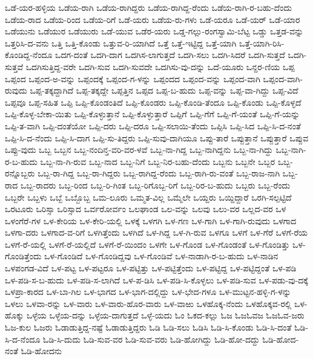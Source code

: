 ಒಡೆ-ಯರ-ಹಳ್ಳಿಯ
ಒಡೆಯ-ರಾಗಿ
ಒಡೆಯ-ರಾಗಿದ್ದರು
ಒಡೆಯ-ರಾಗಿದ್ದ-ರೆಂದು
ಒಡೆಯ-ರಾಗಿ-ರ-ಬಹು-ದೆಂದು
ಒಡೆಯ-ರಾದ
ಒಡೆಯ-ರಿಂದ
ಒಡೆಯ-ರಿಗೆ
ಒಡೆ-ಯರು
ಒಡೆಯ-ರು-ಗಳು
ಒಡೆ-ಯರೂ
ಒಡೆ-ಯರ್
ಒಡೆ-ಯಾರ
ಒಡೆಯುನು
ಒಡೆಯುರ
ಒಡೆಯುರು
ಒಡೆ-ಯುವ
ಒಡೆರ-ಯರು
ಒಡ್ಡ-ಗಲ್ಲು-ರಂಗಸ್ವಾಮಿ-ಬೆಟ್ಟ
ಒಡ್ಡು
ಒತ್ತಡ-ವನ್ನು
ಒತ್ತರಿಸಿ-ದ-ವನು
ಒತ್ತಿ
ಒತ್ತಿ-ಕೊಂಡು
ಒತ್ತುವ-ರಿ-ಯಾಗಿದೆ
ಒತ್ತೆ
ಒತ್ತೆ-ಇಟ್ಟಿದ್ದ
ಒತ್ತೆ-ಯಾಗಿ
ಒತ್ತೆ-ಯಾಗಿ-ರಿಸಿ-ಕೊಂಡಿದ್ದ-ನೆಂದೂ
ಒದಗ-ದಂತೆ
ಒದಗಿ-ದಾಗ
ಒದಗಿಸ-ಲಾಗುತ್ತದೆ
ಒದಗಿ-ಸಲು
ಒದಗಿ-ಸಿದರೆ
ಒದಗಿ-ಸುತ್ತದೆ
ಒದಗಿ-ಸುತ್ತವೆ
ಒದಗಿಸುತ್ತಿದ್ದ-ವರೇ
ಒದಗಿ-ಸುವ
ಒದಗಿ-ಸುವದೇ
ಒದಗಿಸು-ವು-ದನ್ನು
ಒದೆ-ಯೂರು
ಒನ್ದರ-ಣಿಯ
ಒಪ್ಪ
ಒಪ್ಪಂದ
ಒಪ್ಪಂದ-ಅ-ವನ್ನು
ಒಪ್ಪಂದಕ್ಕೆ
ಒಪ್ಪಂದ-ಗ-ಳನ್ನು
ಒಪ್ಪಂದದ
ಒಪ್ಪಂದ-ವನ್ನು
ಒಪ್ಪಂದ-ವಾಗಿ
ಒಪ್ಪಂದ-ವಾಗಿ-ರುವುದು
ಒಪ್ಪ-ತಕ್ಕದ್ದಾಗಿದೆ
ಒಪ್ಪ-ತಕ್ಕದ್ದೇ
ಒಪ್ಪತ್ತಿನ
ಒಪ್ಪದ
ಒಪ್ಪ-ಬ-ಹುದು
ಒಪ್ಪ-ವನ್ನು
ಒಪ್ಪ-ವಾ-ಗಿದ್ದು
ಒಪ್ಪ-ವಿದೆ
ಒಪ್ಪವೂ
ಒಪ್ಪ-ಸಹಿತ
ಒಪ್ಪಿ
ಒಪ್ಪಿ-ಕೊಂಡಂತಿದೆ
ಒಪ್ಪಿ-ಕೊಂಡರು
ಒಪ್ಪಿ-ಕೊಂಡಿ-ತೆಂದೂ
ಒಪ್ಪಿ-ಕೊಂಡು
ಒಪ್ಪಿ-ಕೊಳ್ಳದೆ
ಒಪ್ಪಿ-ಕೊಳ್ಳ-ಬೇಕಾ-ಯಿತು
ಒಪ್ಪಿ-ಕೊಳ್ಳುತ್ತಾನೆ
ಒಪ್ಪಿ-ಕೊಳ್ಳುತ್ತಾರೆ
ಒಪ್ಪಿಗೆ
ಒಪ್ಪಿ-ಗೆಗೆ
ಒಪ್ಪಿ-ಗೆ-ಯಂತೆ
ಒಪ್ಪಿ-ಗೆ-ಯನ್ನು
ಒಪ್ಪಿ-ತ-ವಾಗಿ
ಒಪ್ಪಿ-ದಂತೆಯೋ
ಒಪ್ಪಿ-ದರು
ಒಪ್ಪಿ-ದರೂ
ಒಪ್ಪಿ-ಸಲಾಯಿ-ತೆಂದು
ಒಪ್ಪಿಸಿ
ಒಪ್ಪಿ-ಸಿದ
ಒಪ್ಪಿ-ಸಿ-ದ-ನಂತೆ
ಒಪ್ಪಿ-ಸಿ-ದ-ನೆಂದು
ಒಪ್ಪಿ-ಸಿ-ದಾಗ
ಒಪ್ಪಿ-ಸು-ತಿದ್ದರು
ಒಪ್ಪಿ-ಸುವು-ದಾಗಿಯೂ
ಒಪ್ಪು-ತಾರೆ
ಒಪ್ಪುತ್ತಾನೆ
ಒಪ್ಪುತ್ತಾರೆ
ಒಪ್ಪುವ
ಒಪ್ಪು-ವುದು
ಒಬ್ಬ
ಒಬ್ಬನ
ಒಬ್ಬ-ನಂದಿನ್ತ-ವರಿ-ವರ-ಳವೆ
ಒಬ್ಬ-ನಾ-ಗಿದ್ದ
ಒಬ್ಬ-ನಾಗಿದ್ದನು
ಒಬ್ಬ-ನಾ-ಗಿದ್ದು
ಒಬ್ಬ-ನಾಗಿ-ರ-ಬ-ಹುದು
ಒಬ್ಬ-ನಾ-ಗಿ-ರುವ
ಒಬ್ಬ-ನಾದ
ಒಬ್ಬ-ನಿಗೆ
ಒಬ್ಬ-ನಿರ-ಬಹು-ದೆಂದು
ಒಬ್ಬನು
ಒಬ್ಬನೇ
ಒಬ್ಬರ
ಒಬ್ಬ-ರನ್ನೊಬ್ಬರು
ಒಬ್ಬ-ರಾ-ಗಿದ್ದ
ಒಬ್ಬ-ರಾ-ಗಿದ್ದರು
ಒಬ್ಬ-ರಾಗಿದ್ದ-ರೆಂದು
ಒಬ್ಬ-ರಾಗಿ-ರು-ವಂತೆ
ಒಬ್ಬ-ರಾಜ-ನಾಗಿ
ಒಬ್ಬ-ರಾದ
ಒಬ್ಬ-ರಾದರು
ಒಬ್ಬ-ರಿಂದ
ಒಬ್ಬ-ರಿ-ಗಿಂತ
ಒಬ್ಬ-ರಿಗೊಬ್ಬ-ರಿಗೆ
ಒಬ್ಬ-ರಿರ-ಬ-ಹುದು
ಒಬ್ಬರು
ಒಬ್ಬ-ರೆಂದು
ಒಬ್ಬರೇ
ಒಬ್ಬಳು
ಒಬ್ಬೆ
ಒಬ್ಬೊಬ್ಬ
ಒಮ-ಲೂರು
ಒಮ್ಮತ-ವಿಲ್ಲ
ಒಮ್ಮೆಲೇ
ಒಯ್ದರು
ಒಯ್ದಿದ್ದಾರೆ
ಒರಗಿ-ಸಲ್ಪಟ್ಟಿದೆ
ಒರಟೂರು
ಒರಿಸ್ಸಾ
ಒರಿಸ್ಸಾದ
ಒರ್ವರೋರ್ವಂ
ಒಲಘಾಂಡ
ಒಲ-ವನ್ನು
ಒಲವು
ಒಲು-ವರ
ಒಲ್ಲದ-ವರ
ಒಳ
ಒಳಂಗೆರೆ-ಗಳ
ಒಳ-ಕೇರಿಯ
ಒಳ-ಕೇರಿ-ಯಲ್ಲಿ
ಒಳಕ್ಕೆ
ಒಳಗಗಿ
ಒಳ-ಗಣ
ಒಳ-ಗಾಗಿ
ಒಳ-ಗಾಗಿ-ರುವುದು
ಒಳಗಾದ
ಒಳಗಾ-ದರು
ಒಳಗಾದ-ವ-ರಿಗೆ
ಒಳಗಿತ್ತೆಂದು
ಒಳಗಿದೆ
ಒಳ-ಗಿದ್ದ
ಒಳ-ಗಿ-ರುವ
ಒಳಗೂ
ಒಳಗೆ
ಒಳ-ಗೆರೆ
ಒಳಗೆ-ರೆಯ
ಒಳಗೆ-ರೆ-ಯಲ್ಲಿ
ಒಳಗೆ-ರೆ-ಯಲ್ಲಿದೆ
ಒಳಗೆ-ರೆ-ಯಿಂದಂ
ಒಳಗೇ
ಒಳ-ಗೊಂಡ
ಒಳ-ಗೊಂಡಂತೆ
ಒಳ-ಗೊಂಡಿತ್ತು
ಒಳ-ಗೊಂಡಿತ್ತೆಂದು
ಒಳ-ಗೊಂಡಿದೆ
ಒಳ-ಗೊಂಡಿದ್ದವು
ಒಳ-ಗೊಂಡಿವೆ
ಒಳ-ನಾಡಾಗಿ-ರ-ಬ-ಹುದು
ಒಳ-ನಾಡಿನ
ಒಳಪಂಗಡ-ವಿದೆ
ಒಳ-ಪಟ್ಟ
ಒಳ-ಪಟ್ಟರೂ
ಒಳ-ಪಟ್ಟಿತ್ತು
ಒಳ-ಪಟ್ಟಿತ್ತೆಂದು
ಒಳ-ಪಟ್ಟಿದ್ದ
ಒಳ-ಪಟ್ಟಿದ್ದಂತೆ
ಒಳ-ಪಡಿ
ಒಳ-ಪಡಿ-ಸ-ಬ-ಹುದು
ಒಳ-ಪಡಿ-ಸ-ಲಾಗಿದೆ
ಒಳ-ಪ-ಡಿಸಿ
ಒಳ-ಪಡಿ-ಸಿ-ಕೊಳ್ಳಲು
ಒಳ-ಪಡಿ-ಸುವ
ಒಳ-ಪಡು-ವು-ದಕ್ಕೆ
ಒಳಪ್ರಾ-ಕಾರದ
ಒಳ-ಬಾ-ಗಿಲ
ಒಳ-ಭಾಗದ
ಒಳ-ಭಾಗ-ದಲ್ಲಿದ್ದು
ಒಳ-ಭೇದ-ಗಳೂ
ಒಳ-ಮುಟ್ಟನ-ಹಳ್ಳಿ-ಗ-ಳನ್ನು
ಒಳಲು
ಒಳವಾ-ರನ್ನು
ಒಳ-ವಾರು
ಒಳ-ವಾರು-ಹೊರ-ವಾರು
ಒಳ-ವಾಱು
ಒಳಹೊಕ್ಕ-ನೆಂದು
ಒಳಹೊಕ್ಕವ-ರಲ್ಲಿ
ಒಳ-ಹೊಕ್ಕು
ಒಳ್ಳೆಯ
ಒಳ್ಳೆಯ-ದನ್ನು
ಒಳ್ಳೆಯ-ದಾಗುತ್ತದೆ
ಒಳ್ಳೆ-ಯದು
ಓಂ
ಓಕದ-ಕಲ್ಲು
ಓಜ
ಓಜಓವಜ
ಓಜಓವ-ಜರು
ಓಜ-ಕುಲ
ಓಜರು
ಓಡಾಡುತ್ತಿದ್ದ-ನಷ್ಟೆ
ಓಡಾಡುತ್ತಿದ್ದರು
ಓಡಿ
ಓಡಿ-ಸಲು
ಓಡಿಸಿ
ಓಡಿ-ಸಿ-ಕೊಂಡು
ಓಡಿ-ಸಿ-ದಂತೆ
ಓಡಿ-ಸಿ-ದ-ನೆಂದೂ
ಓಡಿ-ಸಿ-ದುದು
ಓಡಿ-ಸುವ-ವರ
ಓಡಿ-ಸುವ-ವರು
ಓಡಿ-ಹೋಗಿದ್ದು
ಓಡಿ-ಹೋ-ದದ್ದು
ಓಡಿ-ಹೋದ-ನಂತೆ
ಓಡಿ-ಹೋದನು
